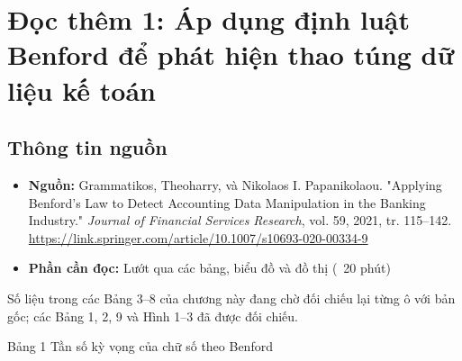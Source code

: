 \chapter{Đọc thêm 1: Áp dụng định luật Benford để phát hiện thao túng dữ liệu kế toán}
\label{ch:M2L4-reading1}


\section{Thông tin nguồn}

\begin{itemize}
  \item \textbf{Nguồn:} Grammatikos, Theoharry, và Nikolaos I. Papanikolaou. "Applying Benford's Law to Detect Accounting Data Manipulation in the Banking Industry." \emph{Journal of Financial Services Research}, vol. 59, 2021, tr. 115--142. \url{https://link.springer.com/article/10.1007/s10693-020-00334-9}
  \item \textbf{Phần cần đọc:} Lướt qua các bảng, biểu đồ và đồ thị (~20 phút)
\end{itemize}

\begin{tcolorbox}[colback=yellow!10,colframe=black!40,title={Lưu ý kiểm chứng}]
\small Số liệu trong các Bảng 3--8 của chương này đang chờ đối chiếu lại từng ô với bản gốc; các Bảng 1, 2, 9 và Hình 1--3 đã được đối chiếu.
\end{tcolorbox}

Bảng 1 Tần số kỳ vọng của chữ số theo Benford

